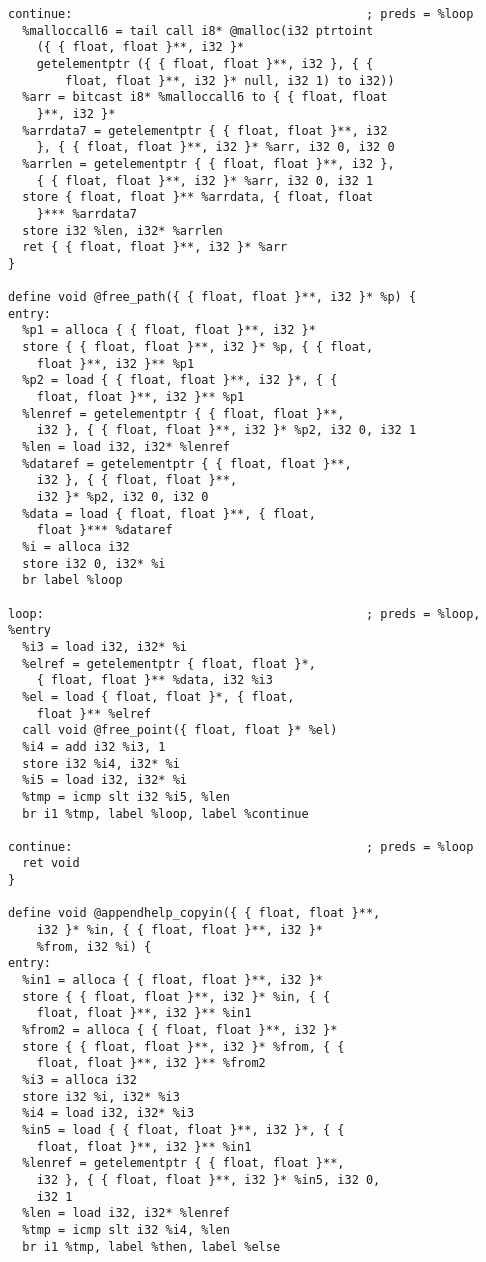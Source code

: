 \documentclass[main.tex]{subfiles}
\begin{document}
{\begin{lstlisting}
continue:                                         ; preds = %loop
  %malloccall6 = tail call i8* @malloc(i32 ptrtoint
    ({ { float, float }**, i32 }* 
    getelementptr ({ { float, float }**, i32 }, { {
        float, float }**, i32 }* null, i32 1) to i32))
  %arr = bitcast i8* %malloccall6 to { { float, float
    }**, i32 }*
  %arrdata7 = getelementptr { { float, float }**, i32
    }, { { float, float }**, i32 }* %arr, i32 0, i32 0
  %arrlen = getelementptr { { float, float }**, i32 },
    { { float, float }**, i32 }* %arr, i32 0, i32 1
  store { float, float }** %arrdata, { float, float
    }*** %arrdata7
  store i32 %len, i32* %arrlen
  ret { { float, float }**, i32 }* %arr
}

define void @free_path({ { float, float }**, i32 }* %p) {
entry:
  %p1 = alloca { { float, float }**, i32 }*
  store { { float, float }**, i32 }* %p, { { float,
    float }**, i32 }** %p1
  %p2 = load { { float, float }**, i32 }*, { {
    float, float }**, i32 }** %p1
  %lenref = getelementptr { { float, float }**,
    i32 }, { { float, float }**, i32 }* %p2, i32 0, i32 1
  %len = load i32, i32* %lenref
  %dataref = getelementptr { { float, float }**,
    i32 }, { { float, float }**, 
    i32 }* %p2, i32 0, i32 0
  %data = load { float, float }**, { float, 
    float }*** %dataref
  %i = alloca i32
  store i32 0, i32* %i
  br label %loop

loop:                                             ; preds = %loop, %entry
  %i3 = load i32, i32* %i
  %elref = getelementptr { float, float }*,
    { float, float }** %data, i32 %i3
  %el = load { float, float }*, { float, 
    float }** %elref
  call void @free_point({ float, float }* %el)
  %i4 = add i32 %i3, 1
  store i32 %i4, i32* %i
  %i5 = load i32, i32* %i
  %tmp = icmp slt i32 %i5, %len
  br i1 %tmp, label %loop, label %continue

continue:                                         ; preds = %loop
  ret void
}

define void @appendhelp_copyin({ { float, float }**,
    i32 }* %in, { { float, float }**, i32 }*
    %from, i32 %i) {
entry:
  %in1 = alloca { { float, float }**, i32 }*
  store { { float, float }**, i32 }* %in, { { 
    float, float }**, i32 }** %in1
  %from2 = alloca { { float, float }**, i32 }*
  store { { float, float }**, i32 }* %from, { {
    float, float }**, i32 }** %from2
  %i3 = alloca i32
  store i32 %i, i32* %i3
  %i4 = load i32, i32* %i3
  %in5 = load { { float, float }**, i32 }*, { { 
    float, float }**, i32 }** %in1
  %lenref = getelementptr { { float, float }**,
    i32 }, { { float, float }**, i32 }* %in5, i32 0,
    i32 1
  %len = load i32, i32* %lenref
  %tmp = icmp slt i32 %i4, %len
  br i1 %tmp, label %then, label %else


\end{lstlisting}}
\end{document}
